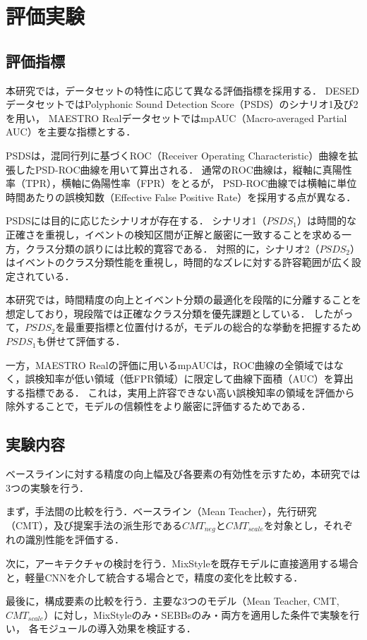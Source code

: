 \documentclass[main]{subfiles}
\begin{document}
\chapter{評価実験}
    \label{評価実験}
\section{評価指標}
    \label{評価指標}
本研究では，データセットの特性に応じて異なる評価指標を採用する．
DESEDデータセットではPolyphonic Sound Detection Score（PSDS）\cite{bilen2020framework}のシナリオ1及び2を用い，
MAESTRO RealデータセットではmpAUC（Macro-averaged Partial AUC）を主要な指標とする．\par

PSDSは，混同行列に基づくROC（Receiver Operating Characteristic）曲線を拡張したPSD-ROC曲線を用いて算出される．
通常のROC曲線は，縦軸に真陽性率（TPR），横軸に偽陽性率（FPR）をとるが，
PSD-ROC曲線では横軸に単位時間あたりの誤検知数（Effective False Positive Rate）を採用する点が異なる．

PSDSには目的に応じたシナリオが存在する．
シナリオ1（$PSDS_1$）は時間的な正確さを重視し，イベントの検知区間が正解と厳密に一致することを求める一方，クラス分類の誤りには比較的寛容である．
対照的に，シナリオ2（$PSDS_2$）はイベントのクラス分類性能を重視し，時間的なズレに対する許容範囲が広く設定されている．

本研究では，時間精度の向上とイベント分類の最適化を段階的に分離することを想定しており，現段階では正確なクラス分類を優先課題としている．
したがって，$PSDS_2$を最重要指標と位置付けるが，モデルの総合的な挙動を把握するため$PSDS_1$も併せて評価する．\par

一方，MAESTRO Realの評価に用いるmpAUCは，ROC曲線の全領域ではなく，誤検知率が低い領域（低FPR領域）に限定して曲線下面積（AUC）を算出する指標である．
これは，実用上許容できない高い誤検知率の領域を評価から除外することで，モデルの信頼性をより厳密に評価するためである．

\section{実験内容}
    \label{実験内容}
ベースラインに対する精度の向上幅及び各要素の有効性を示すため，本研究では3つの実験を行う．\par 
まず，手法間の比較を行う．ベースライン（Mean Teacher），先行研究（CMT），及び提案手法の派生形である$CMT_{neg}$と$CMT_{scale}$を対象とし，それぞれの識別性能を評価する．\par
 次に，アーキテクチャの検討を行う．MixStyleを既存モデルに直接適用する場合と，軽量CNNを介して統合する場合とで，精度の変化を比較する． \par
 最後に，構成要素の比較を行う．主要な3つのモデル（Mean Teacher, CMT, $CMT_{scale}$）に対し，MixStyleのみ・SEBBsのみ・両方を適用した条件で実験を行い，
 各モジュールの導入効果を検証する．\par
\end{document}
